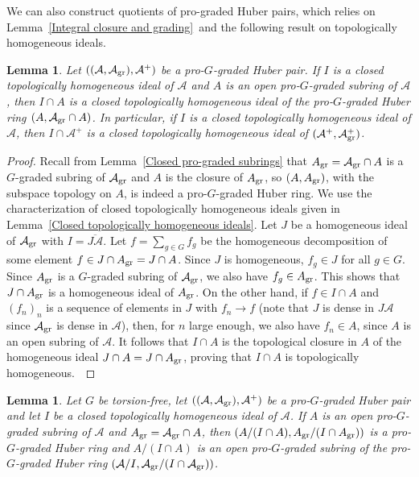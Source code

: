 \documentclass[12pt,twoside,a4paper]{article}
\newtheorem{lemma}[thm]{Lemma}
\theoremstyle{definition}
\theoremstyle{remark}
\newcommand\gr{{\rm gr}}
\begin{document}
We can also construct quotients of pro-graded Huber pairs, which relies on Lemma~\ref{Integral closure and grading} and the following result on topologically homogeneous ideals. 
\begin{lemma}\label{Saturated homogeneous ideals}Let $((\mathcal{A}, \mathcal{A}_{\gr}), \mathcal{A}^{+})$ be a pro-$G$-graded Huber pair. If $I$ is a closed topologically homogeneous ideal of $\mathcal{A}$ and $A$ is an open pro-$G$-graded subring of $\mathcal{A}$, then $I\cap A$ is a closed topologically homogeneous ideal of the pro-$G$-graded Huber ring $(A, \mathcal{A}_{\gr}\cap A)$. In particular, if $I$ is a closed topologically homogeneous ideal of $\mathcal{A}$, then $I\cap \mathcal{A}^{+}$ is a closed topologically homogeneous ideal of $(\mathcal{A}^{+}, \mathcal{A}_{\gr}^{+})$. \end{lemma}
\begin{proof}Recall from Lemma~\ref{Closed pro-graded subrings} that $A_{\gr}=\mathcal{A}_{\gr}\cap A$ is a $G$-graded subring of $\mathcal{A}_{\gr}$ and $A$ is the closure of $A_{\gr}$, so $(A, A_{\gr})$, with the subspace topology on $A$, is indeed a pro-$G$-graded Huber ring. We use the characterization of closed topologically homogeneous ideals given in Lemma~\ref{Closed topologically homogeneous ideals}. Let $J$ be a homogeneous ideal of $\mathcal{A}_{\gr}$ with $I=\overline{J\mathcal{A}}$. Let $f=\sum_{g\in G}f_{g}$ be the homogeneous decomposition of some element $f\in J\cap A_{\gr}=J\cap A$. Since $J$ is homogeneous, $f_{g}\in J$ for all $g\in G$. Since $A_{\gr}$ is a $G$-graded subring of $\mathcal{A}_{\gr}$, we also have $f_{g}\in A_{\gr}$. This shows that $J\cap A_{\gr}$ is a homogeneous ideal of $A_{\gr}$. On the other hand, if $f\in I\cap A$ and $(f_{n})_{n}$ is a sequence of elements in $J$ with $f_{n}\to f$ (note that $J$ is dense in $J\mathcal{A}$ since $\mathcal{A}_{\gr}$ is dense in $\mathcal{A}$), then, for $n$ large enough, we also have $f_{n}\in A$, since $A$ is an open subring of $\mathcal{A}$. It follows that $I\cap A$ is the topological closure in $A$ of the homogeneous ideal $J\cap A=J\cap A_{\gr}$, proving that $I\cap A$ is topologically homogeneous. \end{proof}
\begin{lemma}\label{Quotients of pro-graded Huber pairs 0}Let $G$ be torsion-free, let $((\mathcal{A}, \mathcal{A}_{\gr}), \mathcal{A}^{+})$ be a pro-$G$-graded Huber pair and let $I$ be a closed topologically homogeneous ideal of $\mathcal{A}$. If $A$ is an open pro-$G$-graded subring of $\mathcal{A}$ and $A_{\gr}=\mathcal{A}_{\gr}\cap A$, then $(A/(I\cap A), A_{\gr}/(I\cap A_{\gr}))$ is a pro-$G$-graded Huber ring and $A/(I\cap A)$ is an open pro-$G$-graded subring of the pro-$G$-graded Huber ring $(\mathcal{A}/I, \mathcal{A}_{\gr}/(I\cap \mathcal{A}_{\gr}))$.\end{lemma}
\end{document}
